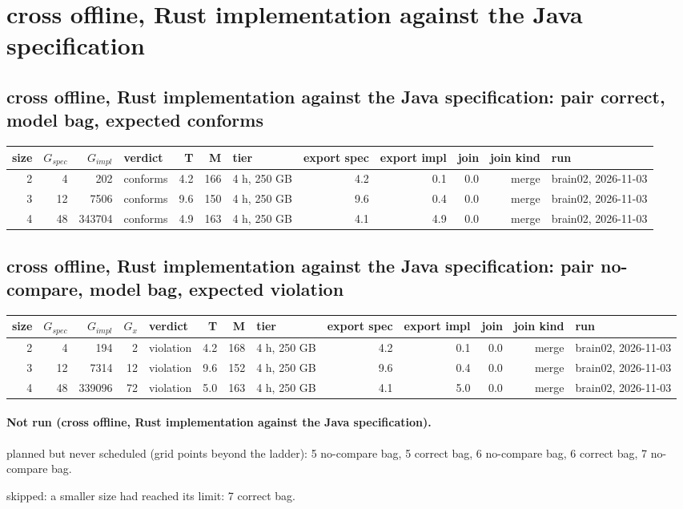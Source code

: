 \documentclass[10pt]{article}
\begin{document}
\section*{cross offline, Rust implementation against the Java specification}
\subsection*{cross offline, Rust implementation against the Java specification: pair \textsf{correct}, model bag, expected conforms}
\begin{longtable}{@{}rrrlrrlrrrrl@{}}
\toprule
size & $G_{\mathit{spec}}$ & $G_{\mathit{impl}}$ & verdict & T & M & tier & export spec & export impl & join & join kind & run \\
\midrule
\endhead
\color{blue} 2 & 4 & 202 & conforms & 4.2 & 166 & 4 h, 250 GB & 4.2 & 0.1 & 0.0 & merge & brain02, 2026-11-03 \\
\color{blue} 3 & 12 & 7506 & conforms & 9.6 & 150 & 4 h, 250 GB & 9.6 & 0.4 & 0.0 & merge & brain02, 2026-11-03 \\
\color{blue} 4 & 48 & 343704 & conforms & 4.9 & 163 & 4 h, 250 GB & 4.1 & 4.9 & 0.0 & merge & brain02, 2026-11-03 \\
\bottomrule
\end{longtable}
\subsection*{cross offline, Rust implementation against the Java specification: pair \textsf{no-compare}, model bag, expected violation}
\begin{longtable}{@{}rrrrlrrlrrrrl@{}}
\toprule
size & $G_{\mathit{spec}}$ & $G_{\mathit{impl}}$ & $G_x$ & verdict & T & M & tier & export spec & export impl & join & join kind & run \\
\midrule
\endhead
\color{blue} 2 & 4 & 194 & 2 & violation & 4.2 & 168 & 4 h, 250 GB & 4.2 & 0.1 & 0.0 & merge & brain02, 2026-11-03 \\
\color{blue} 3 & 12 & 7314 & 12 & violation & 9.6 & 152 & 4 h, 250 GB & 9.6 & 0.4 & 0.0 & merge & brain02, 2026-11-03 \\
\color{blue} 4 & 48 & 339096 & 72 & violation & 5.0 & 163 & 4 h, 250 GB & 4.1 & 5.0 & 0.0 & merge & brain02, 2026-11-03 \\
\bottomrule
\end{longtable}
\paragraph{Not run (cross offline, Rust implementation against the Java specification).}
planned but never scheduled (grid points beyond the ladder): 5 no-compare bag, 5 correct bag, 6 no-compare bag, 6 correct bag, 7 no-compare bag.\par
skipped: a smaller size had reached its limit: 7 correct bag.\par
\end{document}
